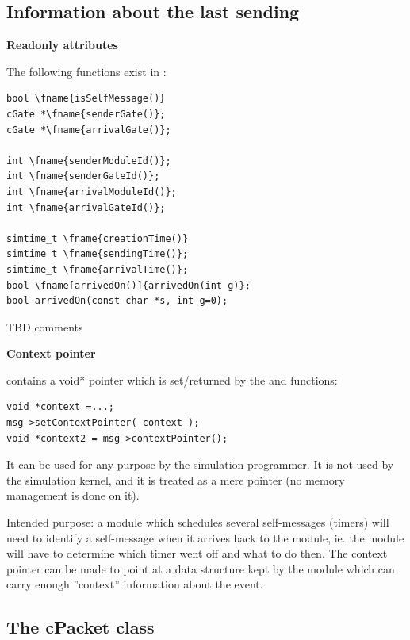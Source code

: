 \subsection{Information about the last sending}

\textbf{Readonly attributes}


The following functions exist in :

\begin{Verbatim}[commandchars=\\\{\}]
bool \fname{isSelfMessage()}
cGate *\fname{senderGate()};
cGate *\fname{arrivalGate()};

int \fname{senderModuleId()};
int \fname{senderGateId()};
int \fname{arrivalModuleId()};
int \fname{arrivalGateId()};

simtime_t \fname{creationTime()}
simtime_t \fname{sendingTime()};
simtime_t \fname{arrivalTime()};
bool \fname[arrivedOn()]{arrivedOn(int g)};
bool arrivedOn(const char *s, int g=0);
\end{Verbatim}

TBD comments


\textbf{Context pointer}


 contains a void* pointer which is
set/returned by the  and
 functions:

\begin{Verbatim}
void *context =...;
msg->setContextPointer( context );
void *context2 = msg->contextPointer();
\end{Verbatim}


It can be used for any purpose by the simulation programmer. 
It is not used by the simulation kernel, and it is treated as 
a mere pointer (no memory management is done on it).

Intended purpose: a module which schedules several self-messages
(timers) will need to identify a self-message when it arrives back to
the module, ie. the module will have to determine which timer went off
and what to do then. The context pointer can be
made to point at a data structure kept by the module which can carry
enough ''context'' information about the event.





\subsection{The cPacket class}


